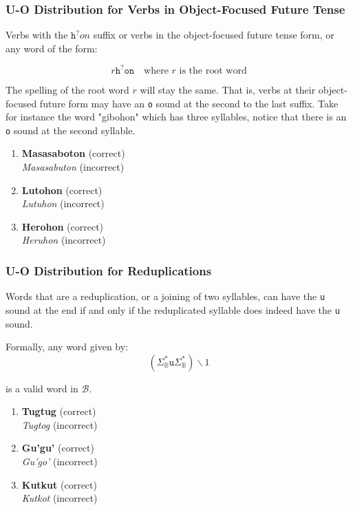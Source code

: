 \subsubsection{U-O Distribution for Verbs in Object-Focused Future Tense}

Verbs with the $\texttt{h}^?on$ suffix or verbs in the object-focused future tense form, or any word of the form:

\[
      r \texttt{h}^? \texttt{on} \quad \text{where } r \text{ is the root word}
\]

The spelling of the root word $r$ will stay the same. That is, verbs at their object-focused future form may have an \texttt{o} sound at the second to the last suffix. Take for instance the word "gibohon" which has three syllables, notice that there is an \texttt{o} sound at the second syllable.

\begin{example}
\end{example}

\begin{enumerate}
      \item \textbf{Masasaboton} (correct) \\
            \textit{Masasabuton} (incorrect)
      \item \textbf{Lutohon} (correct) \\
            \textit{Lutuhon} (incorrect)
      \item \textbf{Herohon} (correct) \\
            \textit{Heruhon} (incorrect)
\end{enumerate}

\subsubsection{U-O Distribution for Reduplications}

Words that are a reduplication, or a joining of two syllables, can have the \texttt{u} sound at the end if and only if the reduplicated syllable does indeed have the \texttt{u} sound.

Formally, any word given by:
\[
      \left( \Sigma_\mathbb{B}^*\texttt{u}\Sigma_\mathbb{B}^* \right)\backslash1
\]

is a valid word in $\mathcal{B}$.

\begin{example}

\end{example}

\begin{enumerate}
      \item \textbf{Tugtug} (correct) \\
            \textit{Tugtog} (incorrect)
      \item \textbf{Gu'gu'} (correct)
            \\ \textit{Gu'go'} (incorrect)
      \item \textbf{Kutkut} (correct)
            \\ \textit{Kutkot} (incorrect)
\end{enumerate}


